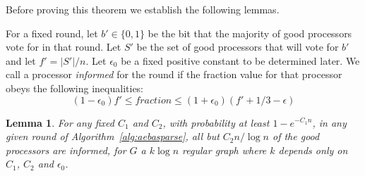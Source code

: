 \documentclass[letterpaper,11pt]{article}
\newtheorem{lemma}{Lemma}
\begin{document}
Before proving this theorem we establish the following lemmas.

For a fixed round, let $b' \in \{ 0, 1\}$ be the bit that the majority of good processors vote for in that round.  Let $S'$ be the set of good processors that will vote for $b'$ and let $f' = |S'|/n$.  Let $\epsilon_{0}$ be a fixed positive constant to be determined later.  We call a processor \emph{informed} for the round if the fraction value for that processor obeys the following inequalities:
$$
(1-\epsilon_{0}) f'  \leq fraction \leq (1+\epsilon_{0}) (f' + 1/3 - \epsilon)
$$


\begin{lemma}
For any fixed $C_{1}$ and $C_{2}$, with probability at least $1- e^{-C_{1}n}$, in any given round of Algorithm~\ref{alg:aebasparse}, all but $C_{2}n/\log n$ of the good processors are informed, for $G$ a $k \log n$ regular graph where $k$ depends only on $C_{1}$, $C_{2}$ and $\epsilon_{0}$. 
\end{lemma}
\end{document}
